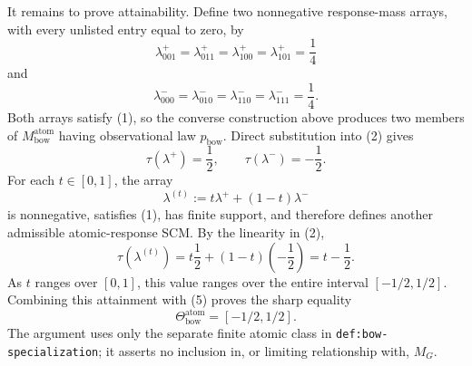 It remains to prove attainability.  Define two nonnegative response-mass arrays, with every unlisted entry equal to zero, by
\[
  \lambda^+_{001}=\lambda^+_{011}
  =\lambda^+_{100}=\lambda^+_{101}=\frac14
\]
and
\[
  \lambda^-_{000}=\lambda^-_{010}
  =\lambda^-_{110}=\lambda^-_{111}=\frac14.
\]
Both arrays satisfy (1), so the converse construction above produces two members of \(M_{\mathrm{bow}}^{\mathrm{atom}}\) having observational law \(p_{\mathrm{bow}}\).  Direct substitution into (2) gives
\[
  \tau(\lambda^+)=\frac12,
  \qquad
  \tau(\lambda^-)=-\frac12.
  \tag{6}
\]
For each \(t\in[0,1]\), the array
\[
  \lambda^{(t)}:=t\lambda^+ +(1-t)\lambda^-
\]
is nonnegative, satisfies (1), has finite support, and therefore defines another admissible atomic-response SCM.  By the linearity in (2),
\[
  \tau(\lambda^{(t)})
  =t\frac12+(1-t)\left(-\frac12\right)
  =t-\frac12.
\]
As \(t\) ranges over \([0,1]\), this value ranges over the entire interval \([-1/2,1/2]\).  Combining this attainment with (5) proves the sharp equality
\[
  \Theta_{\mathrm{bow}}^{\mathrm{atom}}=[-1/2,1/2].
\]
The argument uses only the separate finite atomic class in \texttt{def:bow-specialization}; it asserts no inclusion in, or limiting relationship with, \(M_G\).
